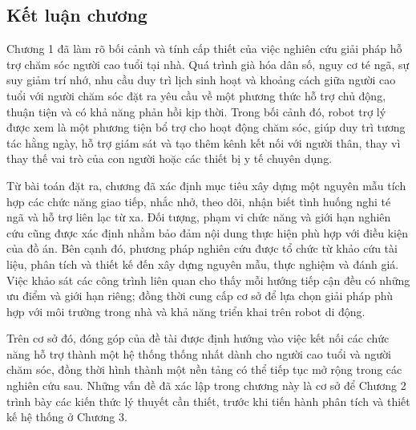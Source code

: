 \subsection{Kết luận chương}

Chương 1 đã làm rõ bối cảnh và tính cấp thiết của việc nghiên cứu giải pháp hỗ trợ chăm sóc người cao tuổi tại nhà. Quá trình già hóa dân số, nguy cơ té ngã, sự suy giảm trí nhớ, nhu cầu duy trì lịch sinh hoạt và khoảng cách giữa người cao tuổi với người chăm sóc đặt ra yêu cầu về một phương thức hỗ trợ chủ động, thuận tiện và có khả năng phản hồi kịp thời. Trong bối cảnh đó, robot trợ lý được xem là một phương tiện bổ trợ cho hoạt động chăm sóc, giúp duy trì tương tác hằng ngày, hỗ trợ giám sát và tạo thêm kênh kết nối với người thân, thay vì thay thế vai trò của con người hoặc các thiết bị y tế chuyên dụng.

Từ bài toán đặt ra, chương đã xác định mục tiêu xây dựng một nguyên mẫu tích hợp các chức năng giao tiếp, nhắc nhở, theo dõi, nhận biết tình huống nghi té ngã và hỗ trợ liên lạc từ xa. Đối tượng, phạm vi chức năng và giới hạn nghiên cứu cũng được xác định nhằm bảo đảm nội dung thực hiện phù hợp với điều kiện của đồ án. Bên cạnh đó, phương pháp nghiên cứu được tổ chức từ khảo cứu tài liệu, phân tích và thiết kế đến xây dựng nguyên mẫu, thực nghiệm và đánh giá. Việc khảo sát các công trình liên quan cho thấy mỗi hướng tiếp cận đều có những ưu điểm và giới hạn riêng; đồng thời cung cấp cơ sở để lựa chọn giải pháp phù hợp với môi trường trong nhà và khả năng triển khai trên robot di động.

Trên cơ sở đó, đóng góp của đề tài được định hướng vào việc kết nối các chức năng hỗ trợ thành một hệ thống thống nhất dành cho người cao tuổi và người chăm sóc, đồng thời hình thành một nền tảng có thể tiếp tục mở rộng trong các nghiên cứu sau. Những vấn đề đã xác lập trong chương này là cơ sở để Chương 2 trình bày các kiến thức lý thuyết cần thiết, trước khi tiến hành phân tích và thiết kế hệ thống ở Chương 3.
